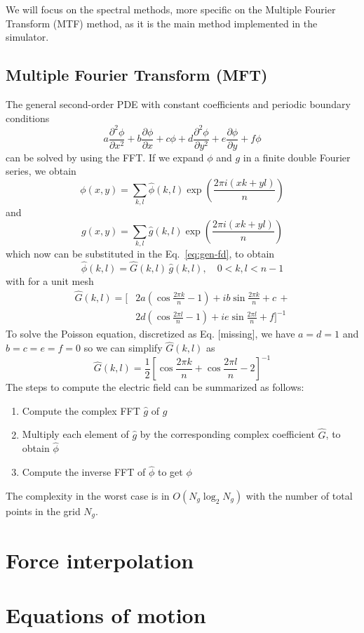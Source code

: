 We will focus on the spectral methods, more specific on the Multiple Fourier 
Transform (MTF) method, as it is the main method implemented in the simulator.

\subsection{Multiple Fourier Transform (MFT)}

The general second-order PDE with constant coefficients and periodic boundary 
conditions
%
\begin{equation}
\label{eq:gen-fd}
a \frac{\partial^2 \phi}{\partial x^2}+b\frac{\partial \phi}{\partial x}+c\phi +
d \frac{\partial^2 \phi}{\partial y^2}+e\frac{\partial \phi}{\partial y}+f\phi
\end{equation}
%
can be solved by using the FFT. If we expand $\phi$ and $g$ in a finite double 
Fourier series, we obtain
%
\begin{equation}
\phi(x,y) = \sum_{k,l} \hat \phi(k, l) \exp\left({\frac{2\pi i (xk + 
yl)}{n}}\right)
\end{equation}
%
and
%
\begin{equation}
g(x,y) = \sum_{k,l} \hat g(k, l) \exp\left({\frac{2\pi i (xk + yl)}{n}}\right)
\end{equation}
%
which now can be substituted in the Eq.~\ref{eq:gen-fd}, to obtain
%
\begin{equation}
\hat \phi(k,l) = \hat G(k,l) \, \hat g(k,l),\quad 0<k,l<n-1
\end{equation}
%
with for a unit mesh
%
\begin{equation}
\begin{split}
\hat G(k,l) = \Bigg[
& 2a \left( \cos \frac{2\pi k}{n} - 1 \right) +
ib \sin \frac{2\pi k}{n} + c \,+ \\
& 2d \left( \cos \frac{2\pi l}{n} - 1 \right) +
ie \sin \frac{2\pi l}{n} + f
\Bigg]^{-1}
\end{split}
\end{equation}
%
To solve the Poisson equation, discretized as Eq. [missing], we have $a=d=1$ and 
$b=c=e=f=0$ so we can simplify $\hat G(k,l)$ as
%
\begin{equation}
\hat G(k,l) = \frac{1}{2}\left[
\cos \frac{2\pi k}{n} +
\cos \frac{2\pi l}{n} -
2 \right]^{-1}
\end{equation}
%
The steps to compute the electric field can be summarized as follows:
\begin{enumerate}
\item Compute the complex FFT $\hat g$ of $g$
\item Multiply each element of $\hat g$ by the corresponding complex coefficient 
$\hat G$, to obtain $\hat \phi$
\item Compute the inverse FFT of $\hat \phi$ to get $\phi$
\end{enumerate}
%
The complexity in the worst case is in $O(N_g \log_2 N_g)$ with the number of 
total points in the grid $N_g$.

\section{Force interpolation}
\section{Equations of motion}


